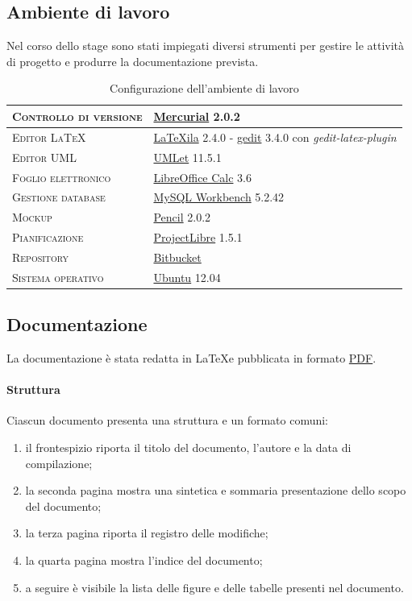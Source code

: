 \subsection{Ambiente di lavoro}
Nel corso dello stage sono stati impiegati diversi strumenti per gestire le attività di progetto e produrre la documentazione prevista.

\begin{table}[ht]
\centering
\begin{tabular}{|l|l|}
\hline
\textsc{Controllo di versione} & \underline{Mercurial} 2.0.2 \\ \hline
\textsc{Editor \LaTeX} & \underline{LaTeXila} 2.4.0 - \underline{gedit} 3.4.0 con \textit{gedit-latex-plugin} \\ \hline
\textsc{Editor UML} & \underline{UMLet} 11.5.1 \\ \hline
\textsc{Foglio elettronico} & \underline{LibreOffice Calc} 3.6 \\ \hline
\textsc{Gestione database} & \underline{MySQL Workbench} 5.2.42 \\ \hline
\textsc{Mockup} & \underline{Pencil} 2.0.2 \\	\hline
\textsc{Pianificazione} & \underline{ProjectLibre} 1.5.1 \\ \hline
\textsc{Repository} & \underline{Bitbucket} \\ \hline
\textsc{Sistema operativo} & \underline{Ubuntu} 12.04 \\ \hline
\end{tabular}
\caption{Configurazione dell'ambiente di lavoro}
\label{tab:tesi:stage:norme:strumenti}
\end{table}

\subsection{Documentazione}
La documentazione è stata redatta in \LaTeX e pubblicata in formato \underline{PDF}.

\paragraph{Struttura}
Ciascun documento presenta una struttura e un formato comuni:
\begin{enumerate}
\item il frontespizio riporta il titolo del documento, l'autore e la data di compilazione;
\item la seconda pagina mostra una sintetica e sommaria presentazione dello scopo del documento;
\item la terza pagina riporta il registro delle modifiche;
\item la quarta pagina mostra l'indice del documento;
\item a seguire è visibile la lista delle figure e delle tabelle presenti nel documento.
\end{enumerate}

